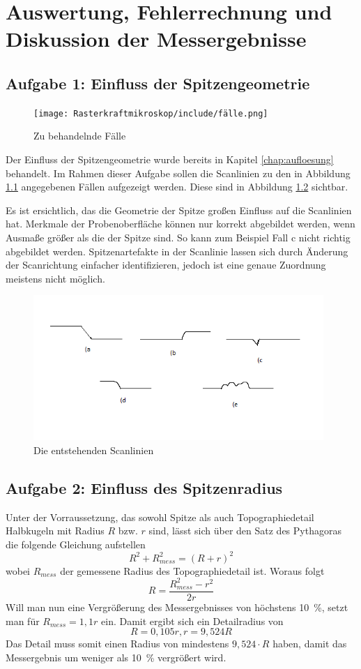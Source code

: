 \chapter{Auswertung, Fehlerrechnung und Diskussion der Messergebnisse}
\section{Aufgabe 1: Einfluss der Spitzengeometrie}
\begin{figure}[H]
    \centering
    \texttt{[image: Rasterkraftmikroskop/include/fälle.png]}
    \caption{Zu behandelnde Fälle} 
    \label{fig:faelle}
\end{figure}
Der Einfluss der Spitzengeometrie wurde bereits in Kapitel \ref{chap:aufloesung} behandelt. Im Rahmen dieser Aufgabe sollen die Scanlinien zu den in Abbildung \ref{fig:faelle} angegebenen Fällen aufgezeigt werden. Diese sind in Abbildung \ref{fig:scanlinien} sichtbar. 


Es ist ersichtlich, das die Geometrie der Spitze großen Einfluss auf die Scanlinien hat. Merkmale der Probenoberfläche können nur korrekt abgebildet werden, wenn Ausmaße größer als die der Spitze sind. So kann zum Beispiel Fall c nicht richtig abgebildet werden. Spitzenartefakte in der Scanlinie lassen sich durch Änderung der Scanrichtung einfacher identifizieren, jedoch ist eine genaue Zuordnung meistens nicht möglich.   
\begin{figure}[H]
    \centering
    \includegraphics[width=110mm,scale=0.5]{Rasterkraftmikroskop/include/scanlinien.png}
    \caption{Die entstehenden Scanlinien} 
    \label{fig:scanlinien}
\end{figure}
\section{Aufgabe 2: Einfluss des Spitzenradius}
Unter der Vorraussetzung, das sowohl Spitze als auch Topographiedetail Halbkugeln mit Radius $R$ bzw. $r$ sind, lässt sich über den Satz des Pythagoras die folgende Gleichung aufstellen
$$R^2 + R_{mess}^2 = (R+r)^2$$
wobei $R_{mess}$ der gemessene Radius des Topographiedetail ist. 
Woraus folgt
$$R = \frac{R_{mess}^2 - r^2}{2r}$$
Will man nun eine Vergrößerung des Messergebnisses von höchstens \SI{10}{\%}, setzt man für $R_{mess} = 1,1 r$ ein. 
Damit ergibt sich ein Detailradius von $$R = 0,105r, r = 9,524R$$
Das Detail muss somit einen Radius von mindestens $9,524\cdot R$ haben, damit das Messergebnis um weniger als \SI{10}{\%} vergrößert wird.


